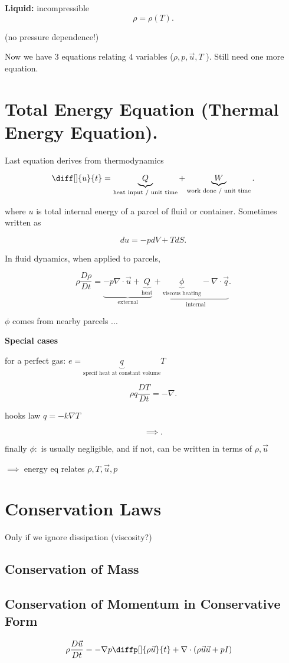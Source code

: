 \textbf{Liquid:} incompressible
\[
  \rho = \rho(T)
.\] 

(no pressure dependence!)


Now we have $3$ equations relating $4$ variables ($ \rho, p, \vec{u}, T$ ).
Still need one more equation.

\section{Total Energy Equation (Thermal Energy Equation).}%

Last equation derives from thermodynamics

\[
\diff[]{u}{t} = \underbrace{Q}_\text{heat input / unit time}
+ \underbrace{W}_\text{work done / unit time}
.\] 

where $u$ is total internal energy of a parcel of fluid or container. Sometimes
written as

\[
du = -p dV + TdS
.\] 

In fluid dynamics, when applied to parcels,

\[
  \rho \frac{D \rho}{Dt} = \underbrace{-p\nabla\cdot \vec{u}
  + \underbrace{Q}_\text{heat}}_\text{external}
  + \underbrace{\underbrace{\phi}_\text{viscous heating} -\nabla\cdot
  \vec{q}}_\text{internal}
.\]

$\phi$ comes from nearby parcels ...

\textbf{Special cases} 

for a perfect gas: $e= \underbrace{q}_\text{specif heat at constant volume}T$ 

\[
\rho q \frac{DT}{Dt} = -\nabla
.\] 

hooks law $q = -k\nabla T$ 

\[
\implies
.\] 

finally $\phi:$ is usually negligible, and if not, can be written in terms of
$ \rho, \vec{u}$ 

$\implies$ energy eq relates $ \rho, T, \vec{u}, p$ 

\section{Conservation Laws}%

Only if we ignore dissipation (viscosity?)
\subsection{Conservation of Mass}%
\subsection{Conservation of Momentum in Conservative Form}%
\begin{align*}
  \rho \frac{D\vec{u}}{Dt} &= - \nabla p \diffp[]{ \rho \vec{u}}{t} + \nabla\cdot ( \rho \vec{u} \vec{u} + pI)
\end{align*}

